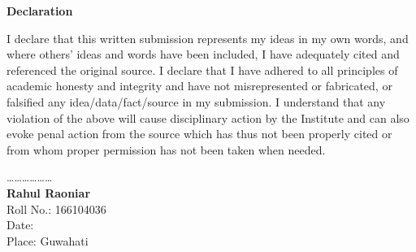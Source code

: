 \documentclass[12pt, a4paper, twoside, openright]{Thesis} %
\newcommand\myemptypage{
    \null
    \thispagestyle{empty}
    \addtocounter{page}{-1}
    \newpage
    }
\begin{document}
\clearpage %





{ %

\centerline{\textbf{\LARGE {Declaration}}}
\vspace{3em}
I declare that this written submission represents my ideas in my own words, and where others' ideas and words have been included, I have adequately cited and referenced the original source. I declare that I have adhered to all principles of academic honesty and integrity and have not misrepresented or fabricated, or falsified any idea/data/fact/source in my submission. I understand that any violation of the above will cause disciplinary action by the Institute and can also evoke penal action from the source which has thus not been properly cited or from whom proper permission has not been taken when needed.

\bigskip
\bigskip
\bigskip
\bigskip

\ldots \ldots \ldots \ldots \ldots \ldots \\
\vspace{2mm}
\textbf{Rahul Raoniar} \\
Roll No.: 166104036 \\
Date: \\
Place: Guwahati
}
\clearpage %




\newpage

\clearpage %
\end{document}
